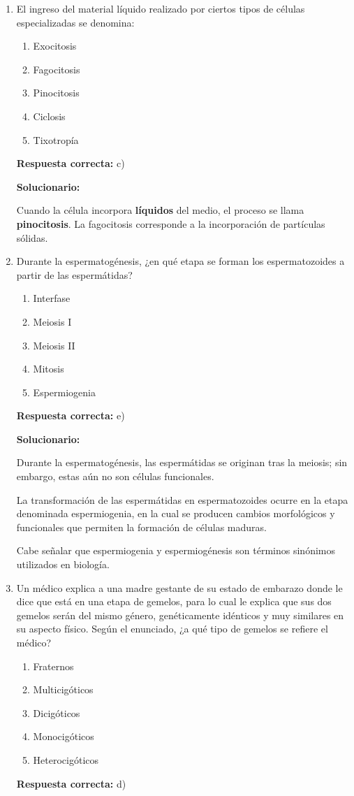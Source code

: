 \begin{enumerate}[resume]
	\item El ingreso del material líquido realizado por ciertos tipos de células especializadas se denomina:
	\begin{enumerate}[label=\alph*)]
		\item Exocitosis
		\item Fagocitosis
		\item Pinocitosis
		\item Ciclosis
		\item Tixotropía
	\end{enumerate}
	\textbf{Respuesta correcta:} c)
	
	\vspace{2mm}
	\textbf{Solucionario:}
	
	Cuando la célula incorpora \textbf{líquidos} del medio, el proceso se llama \textbf{pinocitosis}.  
	La fagocitosis corresponde a la incorporación de partículas sólidas.
	
	\vspace{6mm}
	
	\item Durante la espermatogénesis, ¿en qué etapa se forman los espermatozoides a partir de las espermátidas?
	\begin{enumerate}[label=\alph*)]
		\item Interfase
		\item Meiosis I
		\item Meiosis II
		\item Mitosis
		\item Espermiogenia
	\end{enumerate}
	\textbf{Respuesta correcta:} e)
	
	\vspace{2mm}
	\textbf{Solucionario:}
	
	Durante la espermatogénesis, las espermátidas se originan tras la meiosis; sin embargo, estas aún no son células funcionales.
	
	La transformación de las espermátidas en espermatozoides ocurre en la etapa denominada espermiogenia, en la cual se producen cambios morfológicos y funcionales que permiten la formación de células maduras.
	
	Cabe señalar que espermiogenia y espermiogénesis son términos sinónimos utilizados en biología.
	
	\vspace{6mm}
	\item Un médico explica a una madre gestante de su estado de embarazo donde le dice que está en una etapa de gemelos, para lo cual le explica que sus dos gemelos serán del mismo género, genéticamente idénticos y muy similares en su aspecto físico. Según el enunciado, ¿a qué tipo de gemelos se refiere el médico?
	\begin{enumerate}[label=\alph*)]
		\item Fraternos
		\item Multicigóticos
		\item Dicigóticos
		\item Monocigóticos
		\item Heterocigóticos
	\end{enumerate}
	\textbf{Respuesta correcta:} d)
	

\end{enumerate}

